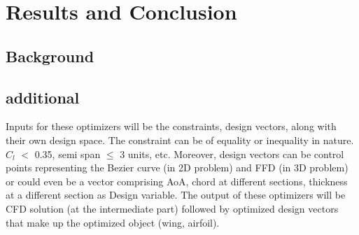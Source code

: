 \chapter{Results and Conclusion}
\label{results}
\section{Background}
\section{additional}

Inputs for these optimizers will be the constraints, design vectors, along with their own design space. The constraint can be of equality or inequality in nature. $C_l$ $<$ 0.35, semi span $\leq$ 3 units, etc. Moreover, design vectors can be control points representing the Bezier curve (in 2D problem) and FFD (in 3D problem) or could even be a vector comprising AoA, chord at different sections, thickness at a different section as Design variable. The output of these optimizers will be CFD solution (at the intermediate part) followed by optimized design vectors that make up the optimized object (wing, airfoil). 


